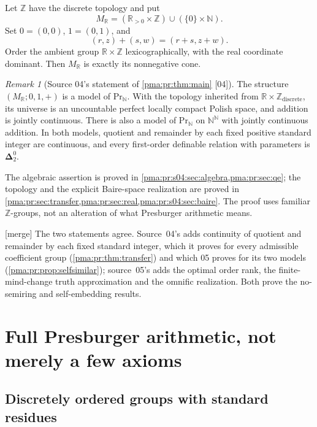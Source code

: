 \documentclass[11pt]{article}
\numberwithin{equation}{section}
\theoremstyle{definition}
\theoremstyle{remark}
\newtheorem{remark}[remark]{Remark}
\newcommand{\N}{\mathbb N}
\newcommand{\Z}{\mathbb Z}
\newcommand{\R}{\mathbb R}
\newcommand{\Baire}{\N^{\N}}
\newcommand{\MR}{M_{\R}}
\newcommand{\src}[1]{\textup{\textsf{\small[#1]}}}
\newcommand{\mergetag}{\textup{\textsf{\small[merge]}}}
\begin{document}
Let $\Z$ have the discrete topology and put
\begin{equation}\label{pma:pr:eq:realmodel}
 \MR=(\R_{>0}\times\Z)\cup(\{0\}\times\N).
\end{equation}
Set $0=(0,0)$, $1=(0,1)$, and
\[
 (r,z)+(s,w)=(r+s,z+w).
\]
Order the ambient group $\R\times\Z$ lexicographically, with the real
coordinate dominant. Then $\MR$ is exactly its nonnegative cone.

\begin{remark}[Source 04's statement of \cref{pma:pr:thm:main} \src{04}]\label{pma:pr:thm:answer}
The structure $(\MR;0,1,+)$ is a model of $\mathrm{Pr}_{\N}$. With the topology
inherited from $\R\times\Z_{\mathrm{discrete}}$, its universe is an
uncountable perfect locally compact Polish space, and addition is jointly
continuous. There is also a model of $\mathrm{Pr}_{\N}$ on $\Baire$ with jointly
continuous addition. In both models, quotient and remainder by each fixed
positive standard integer are continuous, and every first-order definable
relation with parameters is $\boldsymbol\Delta^0_2$.
\end{remark}

The algebraic assertion is proved in \cref{pma:pr:s04:sec:algebra,pma:pr:sec:qe}; the topology
and the explicit Baire-space realization are proved in
\cref{pma:pr:sec:transfer,pma:pr:sec:real,pma:pr:s04:sec:baire}. The proof uses familiar
$\Z$-groups, not an alteration of what Presburger arithmetic means.

\noindent\mergetag{} The two statements agree. Source~04's adds continuity of
quotient and remainder by each fixed standard integer, which it proves for
every admissible coefficient group (\cref{pma:pr:thm:transfer}) and which 05
proves for its two models (\cref{pma:pr:prop:selfsimilar}); source~05's adds
the optimal order rank, the finite-mind-change truth approximation and the
omnific realization. Both prove the no-semiring and self-embedding results.

\section{Full Presburger arithmetic, not merely a few axioms}
\label{pma:pr:sec:algebra}\label{pma:pr:s04:sec:algebra}

\subsection{Discretely ordered groups with standard residues}
\end{document}

